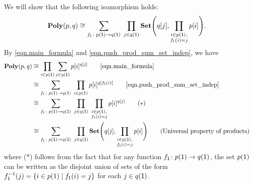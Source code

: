 \documentclass[Book-Poly]{subfiles}
\begin{document}
\begin{exercise}
\begin{solution}
\begin{longenum}
\item We will show that the following isomorphism holds:
\[
	\mathbf{Poly}(p,q) \cong \sum_{f_{\textsf{1}}\colon p(\textsf{1})\to q(\textsf{1})} \; \prod_{j\in q(\textsf{1})}\mathbf{Set}\Bigg(q[j],\prod_{\substack{i \in p(\textsf{1}), \\ f_{\textsf{1}}(i) = j}}p[i]\Bigg).
\]
By \eqref{eqn.main_formula} and \eqref{eqn.push_prod_sum_set_indep}, we have
\begin{align*}
    \poly(p, q) &\iso \prod_{i \in p(\1)} \sum_{j \in q(\1)} p[i]^{q[j]} \tag*{\eqref{eqn.main_formula}} \\
    &\iso \sum_{f_\1 \colon p(\1) \to q(\1)} \; \prod_{i \in p(\1)} p[i]^{q[f_\1(i)]} \tag*{\eqref{eqn.push_prod_sum_set_indep}} \\
    &\iso \sum_{f_\1 \colon p(\1) \to q(\1)} \; \prod_{j \in q(\1)} \; \prod_{\substack{i \in p(\1), \\ f_\1(i) = j}} p[i]^{q[j]} \tag{$\ast$} \\
    &\iso \sum_{f_\1\colon p(\1)\to q(\1)} \; \prod_{j\in q(\1)}\smset\Bigg(q[j],\prod_{\substack{i \in p(\1), \\ f_\1(i) = j}}p[i]\Bigg) \tag{Universal property of products}
\end{align*}
where ($\ast$) follows from the fact that for any function $f_{\textsf{1}} \colon p(\textsf{1}) \to q(\textsf{1})$, the set $p(\textsf{1})$ can be written as the disjoint union of sets of the form $f_{\textsf{1}}^{-1}(j) = \{i \in p(1) \mid f_{\textsf{1}}(i) = j\}$ for each $j \in q(\textsf{1})$.


\end{longenum}
\end{solution}
\end{exercise}
\end{document}
